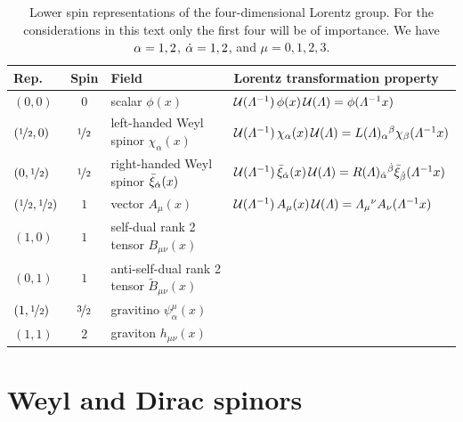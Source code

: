 \begin{table}[t]
   \centering
   \begin{tabular}{@{} lcll @{}} 
      \toprule
      Rep.    & Spin  & Field & Lorentz transformation property\\
      \midrule
      $(0,0)$      & 0   & scalar $\phi(x)$ & 
      $\cU(\Lambda^{-1})\,\phi(x)\,\cU(\Lambda) =\phi(\Lambda^{-1}x)  $\\
      $(\nicefrac{1}{2},0)$      & $\nicefrac{1}{2}$   & left-handed Weyl spinor $\chi_{\alpha}(x)$ 
      &
      $\cU(\Lambda^{-1})\,\chi_{\a}(x)\, \cU(\Lambda) =L(\Lambda)_{\a}{}^{\b}\chi_{\b}(\Lambda^{-1}x)$\\
      $(0,\nicefrac{1}{2})$      & $\nicefrac{1}{2}$   & right-handed Weyl spinor 
      $\bar\xi_{{\dot{\alpha}}}(x)$ &
       $\cU(\Lambda^{-1})\,\bar\xi_{\da}(x)\,\cU(\Lambda) =R(\Lambda)_{\da}{}^{\db}\bar\xi_{\db}(\Lambda^{-1}x)$
      \\
           $(\nicefrac{1}{2},\nicefrac{1}{2})$      & $1$   & vector 
      $A_{\mu}(x)$ &
      $\cU(\Lambda^{-1})\,A_{\mu}(x)\,\cU(\Lambda) =\Lambda_{\mu}{}^{\nu}A_{\nu}(\Lambda^{-1}x)$ \\
     $(1,0)$      & $1$   & self-dual rank 2 tensor
      $B_{\mu\nu}(x)$ & \\
          $(0,1)$      & $1$   & anti-self-dual rank 2 tensor
      $\tilde B_{\mu\nu}(x)$ &  \\
       $(1,\nicefrac{1}{2})$      & $\nicefrac{3}{2}$   & gravitino  $\psi^{\mu}_{\alpha}(x)$ & \\
       $(1,1)$      & $2$   & graviton $h_{\mu\nu}(x)$ & \\
      \bottomrule
   \end{tabular}
   \caption{Lower spin representations of the four-dimensional Lorentz group. For the considerations in this text only the first
   four will be of importance. We have $\alpha=1,2$, ${\dot{\alpha}}=1,2$, and $\mu=0,1,2,3$.}
   \label{tab:reps}
\end{table}


\section{Weyl and Dirac spinors}
\label{sec:1.2}

